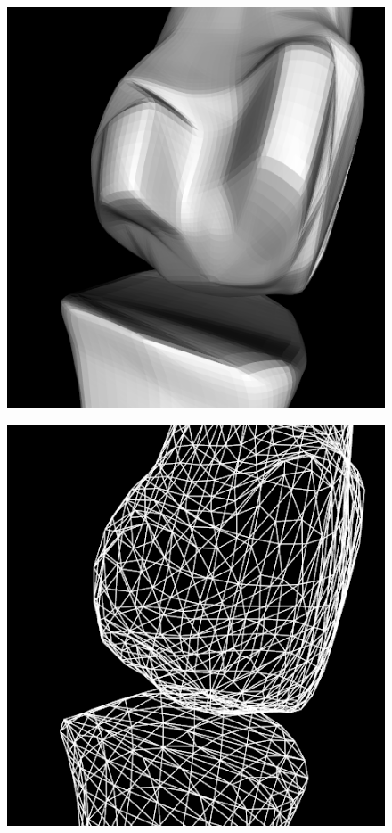 \documentclass[10pt, conference, compsocconf]{IEEEtran}
\begin{document}
\begin{figure}[htbp]
{\begin{minipage}[h]{0.16\linewidth}
        \includegraphics[width=\textwidth]{./Figure/footbones/fingerBones/combined3.png}\vspace{1ex}\\
      \end{minipage}%
      \begin{minipage}[h]{0.16\linewidth}
        \centering
        \includegraphics[width=\textwidth]{./Figure/footbones/fingerBones/combined1-.png}\\

\end{minipage}}
\end{figure}
\end{document}
